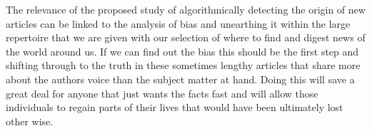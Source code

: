 The relevance of the proposed study of algorithmically detecting the origin of new articles can be linked to the analysis of bias and unearthing it within the large repertoire that we are given with our selection of where to find and digest news of the world around us. 
If we can find out the bias this should be the first step and shifting through to the truth in these sometimes lengthy articles that share more about the authors voice than the subject matter at hand. 
Doing this will save a great deal for anyone that just wants the facts fast and will allow those individuals to regain parts of their lives that would have been ultimately lost other wise.
